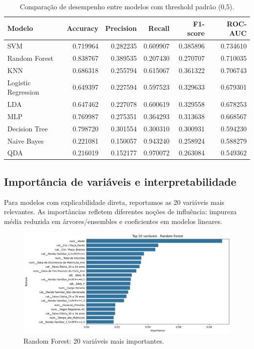 \documentclass[english, spanish, brazilian]{RBIEarticle} %
\begin{document}
\begin{table}[H]
	\centering
	\caption{Comparação de desempenho entre modelos com threshold padrão (0,5).}
	\label{tab:comparacao-global}
	\begin{tabular}{lrrrrr}
	\toprule
	\textbf{Modelo} & \textbf{Accuracy} & \textbf{Precision} & \textbf{Recall} & \textbf{F1-score} & \textbf{ROC-AUC} \\
	\midrule
	SVM                  & 0.719964 & 0.282235 & 0.609907 & 0.385896 & 0.734610 \\
	Random Forest        & 0.838767 & 0.389535 & 0.207430 & 0.270707 & 0.710035 \\
	KNN                  & 0.686318 & 0.255794 & 0.615067 & 0.361322 & 0.706743 \\
	Logistic Regression  & 0.649397 & 0.227594 & 0.597523 & 0.329633 & 0.679301 \\
	LDA                  & 0.647462 & 0.227078 & 0.600619 & 0.329558 & 0.678253 \\
	MLP                  & 0.769987 & 0.275351 & 0.364293 & 0.313638 & 0.668567 \\
	Decision Tree        & 0.798720 & 0.301554 & 0.300310 & 0.300931 & 0.594230 \\
	Naive Bayes          & 0.221081 & 0.150057 & 0.943240 & 0.258924 & 0.588279 \\
	QDA                  & 0.216019 & 0.152177 & 0.970072 & 0.263084 & 0.549362 \\
	\bottomrule
	\end{tabular}
\end{table}


\subsection{Importância de variáveis e interpretabilidade}

Para modelos com explicabilidade direta, reportamos as 20 variáveis mais relevantes. As importâncias refletem diferentes noções de influência: impureza média reduzida em árvores/ensembles e coeficientes em modelos lineares.

\begin{figure}[H]\centering
	\includegraphics[width=1\textwidth]{images/top20-random-forest.jpeg}
	\caption{Random Forest: 20 variáveis mais importantes.}
	\label{fig:feat-rf}
\end{figure}
\end{document}
